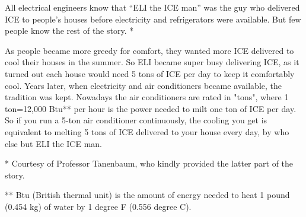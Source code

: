 \usepackage{html}
All electrical engineers know that ``ELI the ICE man'' was the guy who delivered ICE to 
people's houses before electricity and refrigerators were available. But few people know
the rest of the story. *

As people became more greedy for comfort, they wanted more ICE delivered to cool their 
houses in the summer. So ELI became super busy delivering ICE, as it turned out each 
house would need 5 tons of ICE per day to keep it comfortably cool. Years later, when 
electricity and air conditioners became available, the tradition was kept. Nowadays the 
air conditioners are rated in "tons", where 1 ton=12,000 Btu** per hour is the power 
needed to milt one ton of ICE per day. So if you run a 5-ton air conditioner continuously,
the cooling you get is equivalent to melting 5 tons of ICE delivered to your house every 
day, by who else but ELI the ICE man.

* Courtesy of Professor Tanenbaum, who kindly provided the latter part of the story.

** Btu (British thermal unit) is the amount of energy needed to heat 1 pound (0.454 kg) 
of water by 1 degree F (0.556 degree C).


